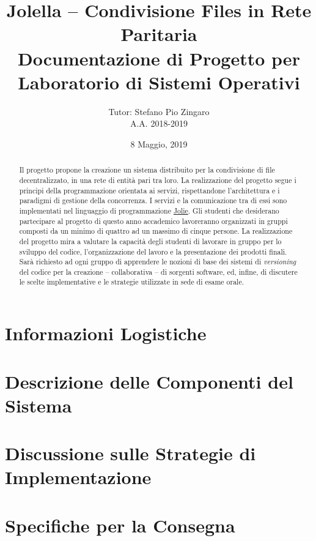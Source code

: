 \documentclass{article}
\title{%
  Jolella -- Condivisione Files in Rete Paritaria\\
  \large Documentazione di Progetto per Laboratorio di Sistemi Operativi}
\author{%
  Tutor: Stefano Pio Zingaro\\
  A.A. 2018-2019}
\date{8 Maggio, 2019}
\begin{document}
\maketitle

\begin{abstract}

 Il progetto propone la creazione un sistema distribuito per la condivisione di
 file decentralizzato, in una rete di entità pari tra loro. La realizzazione del
 progetto segue i principi della programmazione orientata ai servizi,
 rispettandone l'architettura e i paradigmi di gestione della concorrenza. I
 servizi e la comunicazione tra di essi sono implementati nel linguaggio di
 programmazione \href{http://jolie-lang.org}{Jolie}. Gli studenti che desiderano
 partecipare al progetto di questo anno accademico lavoreranno organizzati in
 gruppi composti da un minimo di quattro ad un massimo di cinque persone. La
 realizzazione del progetto mira a valutare la capacità degli studenti di
 lavorare in gruppo per lo sviluppo del codice, l'organizzazione del lavoro e la
 presentazione dei prodotti finali. Sarà richiesto ad ogni gruppo di apprendere
 le nozioni di base dei sistemi di \textit{versioning} del codice per la
 creazione -- collaborativa -- di sorgenti software, ed, infine, di discutere le
 scelte implementative e le strategie utilizzate in sede di esame orale.

\end{abstract}

\newpage

\tableofcontents

\newpage

\section{Informazioni Logistiche}
\label{sec:logistic}


\section{Descrizione delle Componenti del Sistema}
\label{sec:components}


\section{Discussione sulle Strategie di Implementazione}
\label{sec:implementation}


\section{Specifiche per la Consegna}
\label{sec:delivery}




\end{document}

